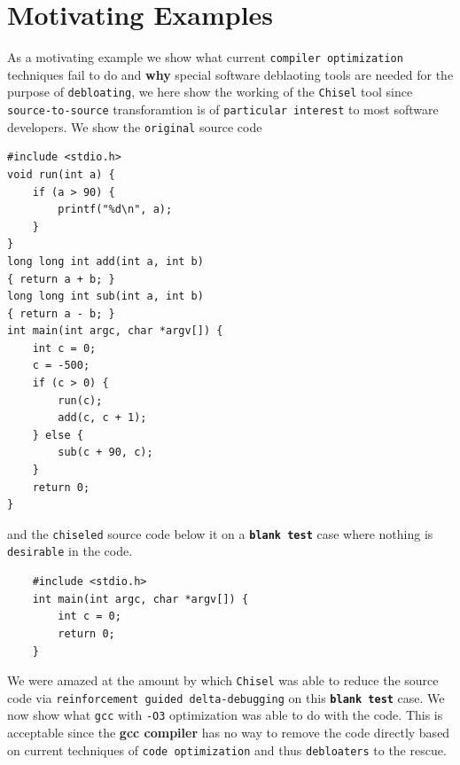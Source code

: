 \documentclass{relatorio}
\begin{document}
\section{Motivating Examples}%

As a motivating example we show what current \texttt{compiler optimization} techniques fail to do and \textbf{why} special software deblaoting tools are needed for the purpose of \texttt{debloating}, we here show the working of the \texttt{Chisel} tool since \texttt{source-to-source} transforamtion is of \texttt{particular interest} to most software developers. We show the \texttt{original} source code

\begin{lstlisting}
#include <stdio.h>
void run(int a) {
	if (a > 90) {
		printf("%d\n", a);
	}
}
long long int add(int a, int b) 
{ return a + b; }
long long int sub(int a, int b) 
{ return a - b; }
int main(int argc, char *argv[]) {
	int c = 0;
	c = -500;
	if (c > 0) {
		run(c);
		add(c, c + 1);
	} else {
		sub(c + 90, c);
	}
	return 0;
}
\end{lstlisting} 

and the \texttt{chiseled} source code below it on a \textbf\texttt{blank test} case where nothing is \texttt{desirable} in the code. 

\begin{lstlisting}
	#include <stdio.h>
	int main(int argc, char *argv[]) {
		int c = 0;
		return 0;
	}
\end{lstlisting}

We were amazed at the amount by which \texttt{Chisel} was able to reduce the source code via \texttt{reinforcement guided delta-debugging} on this \textbf\texttt{blank test} case. We now show what \texttt{gcc} with \texttt{-O3} optimization was able to do with the code. This is acceptable since the \textbf{gcc compiler} has no way to remove the code directly based on current techniques of \texttt{code optimization} and thus \texttt{debloaters} to the rescue. 
\end{document}
